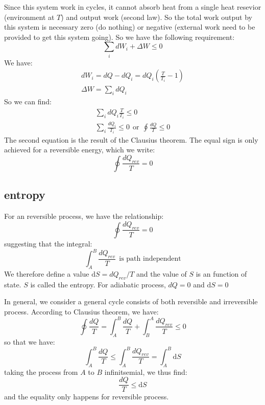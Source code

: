 \documentclass{article}
\newcommand{\dbar}{d}
\newcommand{\dnor}{\text{d}}
\begin{document}
Since this system work in cycles, it cannot absorb heat from a single heat resevior (environment at $T$) 
and output work (second law). So the total work output by this system is necessary zero (do nothing) or negative 
(external work need to be provided to get this system going). So we have the following requirement:
\begin{equation}
    \sum_i \dbar W_i + \Delta W \le 0
\end{equation}
We have:
\begin{gather}
    \dbar W_i = \dbar Q - \dbar Q_i = \dbar Q_i (\frac{T}{T_i} - 1) \\
    \Delta W = \sum_i \dbar Q_i 
\end{gather}
So we can find:
\begin{gather}
    \sum_i \dbar Q_i \frac{T}{T_i} \le 0 \\
    \sum_i \frac{\dbar Q_i}{T_i} \le 0 \ \ \text{or}\ \  \oint \frac{\dbar Q}{T} \le 0
\end{gather}
The second equation is the result of the Clausius theorem. The equal sign is only achieved for a reversible energy,
which we write:
\begin{equation}
    \oint \frac{\dbar Q_{rev}}{T} = 0
\end{equation}

\subsection*{entropy}
For an reversible process, we have the relationship:
\begin{equation}
    \oint \frac{\dbar Q_{rev}}{T} = 0
\end{equation}
suggesting that the integral:
\begin{equation}
    \int_{A}^{B} \frac{\dbar Q_{rev}}{T} \ \ \text{is path independent}
\end{equation}
We therefore define a value $\dnor S = \dbar Q_{rev} / T$ and the value 
of $S$ is an function of state. $S$ is called the entropy. 
For adiabatic process, $\dbar Q = 0$ and $\dnor S = 0$

In general, we consider a general cycle consists of both reversible and 
irreversible process. According to Clausius theorem, we have:
\begin{equation}
    \oint \frac{\dbar Q}{T} = \int_A^B \frac{\dbar Q}{T} + \int_B^A \frac{\dbar Q_{rev}}{T} \le 0
\end{equation}
so that we have:
\begin{equation}
    \int_A^B \frac{\dbar Q}{T} \le \int_A^B \frac{\dbar Q_{rev}}{T} = \int_A^B \dnor S
\end{equation}
taking the process from $A$ to $B$ infinitsemial, we thus find:
\begin{equation}
    \frac{\dbar Q}{T} \le \dnor S
\end{equation}
and the equality only happens for reversible process.
\end{document}
